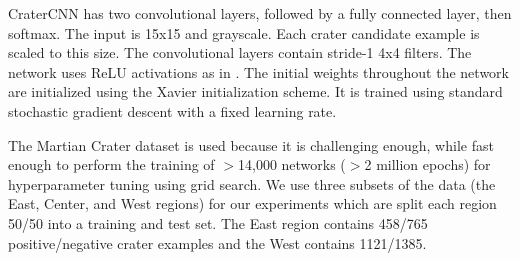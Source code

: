 \documentclass{article}
\begin{document}


CraterCNN has two convolutional layers, followed by a fully connected layer, then softmax. The input is 15x15 and grayscale. Each crater candidate example is scaled to this size. The convolutional layers contain stride-1 4x4 filters.  The network uses ReLU activations as in \cite{krizhevsky_imagenet_2012}. The initial weights throughout the network are initialized using the Xavier initialization \cite{glorot_understanding_2010} scheme. It is trained using standard stochastic gradient descent with a fixed learning rate.

The Martian Crater dataset \cite{bandeira_automatic_2010} is used because it is challenging enough, while fast enough to perform the training of $>$14,000 networks ($>$2 million epochs) for hyperparameter tuning using grid search. We use three subsets of the data (the East, Center, and West regions) for our experiments which are split each region 50/50 into a training and test set. The East region contains 458/765 positive/negative crater examples and the West contains 1121/1385.
\end{document}
